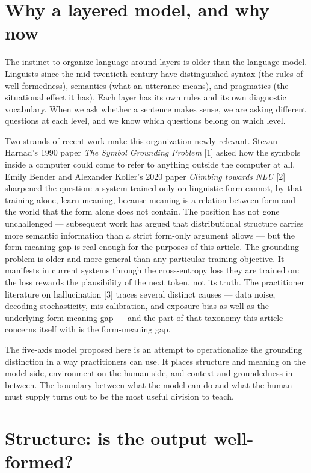 \documentclass[11pt,a4paper]{article}
\begin{document}
\section*{Why a layered model, and why now}

The instinct to organize language around layers is older than the
language model. Linguists since the mid-twentieth century have
distinguished syntax (the rules of well-formedness), semantics
(what an utterance means), and pragmatics (the situational effect
it has). Each layer has its own rules and its own diagnostic
vocabulary. When we ask whether a sentence makes sense, we are
asking different questions at each level, and we know which
questions belong on which level.

Two strands of recent work make this organization newly relevant.
Stevan Harnad's 1990 paper \emph{The Symbol Grounding Problem} [1]
asked how the symbols inside a computer could come to refer to
anything outside the computer at all. Emily Bender and Alexander
Koller's 2020 paper \emph{Climbing towards NLU} [2] sharpened the
question: a system trained only on linguistic form cannot, by that
training alone, learn meaning, because meaning is a relation
between form and the world that the form alone does not contain.
The position has not gone unchallenged --- subsequent work has
argued that distributional structure carries more semantic
information than a strict form-only argument allows --- but the
form-meaning gap is real enough for the purposes of this article.
The grounding problem is older and more general than any
particular training objective. It manifests in current systems
through the cross-entropy loss they are trained on: the loss
rewards the plausibility of the next token, not its truth. The
practitioner literature on hallucination [3] traces several
distinct causes --- data noise, decoding stochasticity,
mis-calibration, and exposure bias as well as the underlying
form-meaning gap --- and the part of that taxonomy this article
concerns itself with is the form-meaning gap.

The five-axis model proposed here is an attempt to operationalize
the grounding distinction in a way practitioners can use. It places
structure and meaning on the model side, environment on the human
side, and context and groundedness in between. The boundary between
what the model can do and what the human must supply turns out to
be the most useful division to teach.

\section*{Structure: is the output well-formed?}
\end{document}
